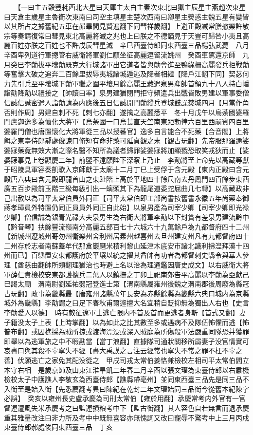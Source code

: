 　　【一曰主五糓豐耗西北大星曰天庫主太白主秦次東北曰獄主辰星主燕趙次東星曰天倉主歲星主魯衛次東南曰司空主填星主楚次西南曰卿星主熒惑主魏五星有變皆以其所占之據舊紀五車在昴畢間見賢遍翻下同彗祥歲翻】上避正殿减常膳撤樂許敬宗等奏請復常曰彗見東北高麗將滅之兆也上曰朕之不德謫見于天豈可歸咎小夷且高麗百姓亦朕之百姓也不許戊辰彗星滅　辛巳西臺侍郎同東西臺三品楊弘武薨　八月辛酉卑列道行軍摠管右威衛將軍劉仁願坐征高麗逗留流姚州　癸酉車駕還京師　九月癸巳李勣拔平壤勣既克大行城諸軍出它道者皆與勣會進至鴨綠柵高麗發兵拒戰勣等奮擊大破之追奔二百餘里拔辱夷城諸城遁逃及降者相繼【降戶江翻下同】契苾何力先引兵至平壤城下勣軍繼之圍平壤月餘高麗王藏遣泉男產帥首領九十八人持白幡詣勣降勣以禮接之【帥讀曰率】泉男建猶閉門拒守頻遣兵出戰皆敗男建以軍事委僧信誠信誠密遣人詣勣請為内應後五日信誠開門勣縱兵登城鼓譟焚城四月【月當作角否則作周】男建自刺不死【刺七亦翻】遂擒之高麗悉平　冬十月戊午以烏荼國婆羅門盧迦逸多為懷化大將軍【烏荼國一曰烏萇直天竺南東距勃律六百里西罽賓四百里婆羅門僧也唐置懷化大將軍從三品以授蕃官】逸多自言能合不死藥【合音閤】上將餌之東臺侍郎郝處俊諫曰脩短有命非藥可延貞觀之末【觀古玩翻】先帝服那羅邇娑婆寐藥竟無效大漸之際名醫不知所為議者歸罪娑婆寐將加顯戮恐取笑戎狄而止【娑婆寐事見上卷顯慶二年】前鑒不遠願陛下深察上乃止　李勣將至上命先以高藏等獻于昭陵具軍容奏凱歌入京師獻于太廟十二月丁巳上受俘于含元殿【東内正殿曰含元殿唐六典曰含元殿即龍首山之東趾階上高於平地四十餘尺南去丹鳳門四百餘步東西廣五百步殿前玉階三級每級引出一螭頭其下為龍尾道委蛇屈曲几七轉】以高藏政非己出赦以為司平太常伯員外同正【司平太常伯即工部尚書按舊書永徽五年尚藥奉御蔣孝璋員外特置仍同正員員外同正自此始】以泉男產為司宰少卿【司宰少卿即光禄少卿】僧信誠為銀青光祿大夫泉男生為右衛大將軍李勣以下封賞有差泉男建流黔中【黔音琴】扶餘豐流嶺南分高麗五部百七十六城六十九萬餘戶為九都督府四十二州【新城州遼城州哥勿州衛樂州舍利州居素州越喜州去旦州建安州凡有九都督府四十二州存於志者南蘇蓋牟代那倉巖磨米積利黎山延津木底安市諸北識利拂湼拜漢十四州而已】百縣置安東都護府於平壤以統之擢其酋帥有功者為都督刺史縣令與華人參理【酋慈由翻帥所類翻理猶治也時避上名以治為理通鑑因唐史成文】以右威衛大將軍薛仁貴檢校安東都護摠兵二萬人以鎮撫之丁卯上祀南郊告平高麗以李勣為亞獻己巳謁太廟　渭南尉劉延祐弱冠登進士第【渭南縣屬雍州後魏之渭南郡後周廢為縣冠古玩翻】政事為畿縣最【唐雍州諸縣萬年長安為赤縣餘縣為畿縣六典曰城内為京縣城外為畿縣】李勣謂之曰足下春秋甫爾遽擅大名宜稍自貶抑無為獨出人右也【史言李勣愛人以德】　時有敇征遼軍士逃亡限内不首及首而更逃者身斬【首式又翻】妻子籍没太子上表【上時掌翻】以為如此之比其數至多或遇病不及隊伍怖懼而逃【怖普布翻】或因樵採為賊所掠或渡海漂没或深入賊庭為所傷殺軍法嚴重同隊恐并獲罪即舉以為逃軍旅之中不暇勘當【當丁浪翻】直據隊司通狀關移所屬妻子没官情實可哀書曰與其殺不辜寧失不經【書大禹謨之言注云經常也寧失不常之罪不枉不辜之善】伏願逃亡之家免其配没從之　甲戌司戎太常伯姜恪兼檢校左相司平太常伯閻立本守右相　是歲京師及山東江淮旱飢二年春二月辛酉以張文瓘為東臺侍郎以右肅機檢校太子中護譙人李敬玄為西臺侍郎【譙縣帶亳州】並同東西臺三品先是同三品不入衘至是始入衘【先悉薦翻考異曰陳紀在乾封二年文瓘始同三品衘今從舊本紀陳字必誤】　癸亥以雍州長史盧承慶為司刑太常伯【雍於用翻】承慶常考内外官有一官督運遭風失米承慶考之曰監運損粮考中下【監古衘翻】其人容色自若無言而退承慶重其雅量改注曰非力所及考中中既無喜容亦無愧詞又改曰寵辱不驚考中上三月丙戍東臺侍郎郝處俊同東西臺三品　丁亥

